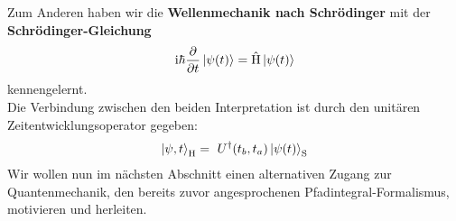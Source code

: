 Zum Anderen haben wir die \textbf{Wellenmechanik nach Schrödinger} mit der \textbf{Schrödinger-Gleichung}
\begin{align}
		\mathrm{i}\hbar \frac{\partial}{\partial t} \ket{\psi(t)} = \hat{\text{H}} \ket{\psi(t)}
	\end{align}
kennengelernt. \\
Die Verbindung zwischen den beiden Interpretation ist durch den unitären Zeitentwicklungsoperator gegeben:
\begin{align}
	\ket{\psi,t}_{\text{H}} = \ U^{\dagger}(t_b,t_a)\ket{\psi(t)}_{\text{S}}
\end{align}
Wir wollen nun im nächsten Abschnitt einen alternativen Zugang zur Quantenmechanik, den bereits zuvor angesprochenen Pfadintegral-Formalismus, motivieren und herleiten.